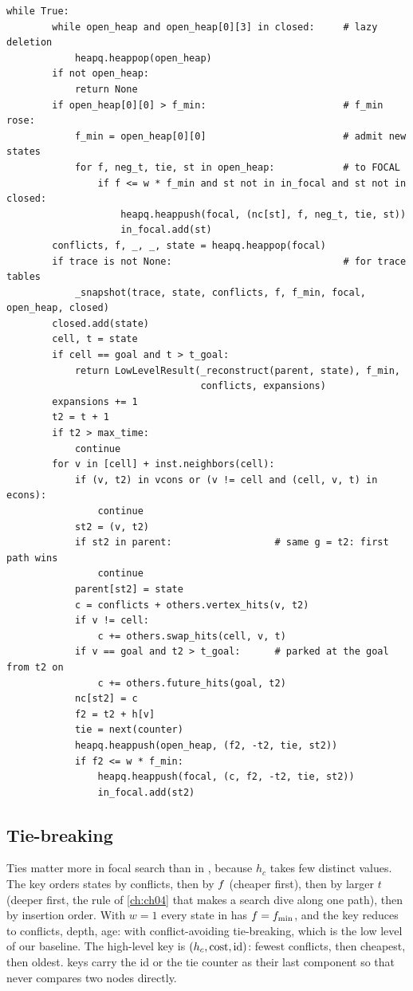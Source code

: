 \begin{lstlisting}[caption={The main loop of the low level: two heaps, lazy purge of \Open, widening of the band, goal test with the lower bound, and successor generation with conflict counts (from \code{code/ch10\_ecbs.py}).},label={lst:ch10-lowlevel}]
    while True:
        while open_heap and open_heap[0][3] in closed:     # lazy deletion
            heapq.heappop(open_heap)
        if not open_heap:
            return None
        if open_heap[0][0] > f_min:                        # f_min rose:
            f_min = open_heap[0][0]                        # admit new states
            for f, neg_t, tie, st in open_heap:            # to FOCAL
                if f <= w * f_min and st not in in_focal and st not in closed:
                    heapq.heappush(focal, (nc[st], f, neg_t, tie, st))
                    in_focal.add(st)
        conflicts, f, _, _, state = heapq.heappop(focal)
        if trace is not None:                              # for trace tables
            _snapshot(trace, state, conflicts, f, f_min, focal, open_heap, closed)
        closed.add(state)
        cell, t = state
        if cell == goal and t > t_goal:
            return LowLevelResult(_reconstruct(parent, state), f_min,
                                  conflicts, expansions)
        expansions += 1
        t2 = t + 1
        if t2 > max_time:
            continue
        for v in [cell] + inst.neighbors(cell):
            if (v, t2) in vcons or (v != cell and (cell, v, t) in econs):
                continue
            st2 = (v, t2)
            if st2 in parent:                  # same g = t2: first path wins
                continue
            parent[st2] = state
            c = conflicts + others.vertex_hits(v, t2)
            if v != cell:
                c += others.swap_hits(cell, v, t)
            if v == goal and t2 > t_goal:      # parked at the goal from t2 on
                c += others.future_hits(goal, t2)
            nc[st2] = c
            f2 = t2 + h[v]
            tie = next(counter)
            heapq.heappush(open_heap, (f2, -t2, tie, st2))
            if f2 <= w * f_min:
                heapq.heappush(focal, (c, f2, -t2, tie, st2))
                in_focal.add(st2)
\end{lstlisting}

\subsection{Tie-breaking}

Ties matter more in focal search than in \astar, because $h_c$ takes few
distinct values. The \Focal key orders states by conflicts, then by
$f$ (cheaper first), then by larger $t$ (deeper first, the rule of
\cref{ch:ch04} that makes a search dive along one path), then by insertion
order. With $w = 1$ every state in \Focal has $f = f_{\min}$, and
the key reduces to conflicts, depth, age: \astar with conflict-avoiding
tie-breaking, which is the low level of our \cbs baseline. The high-level
\Focal key is $(h_c, \operatorname{cost}, \text{id})$: fewest conflicts, then cheapest, then
oldest. \Open keys carry the id or the tie counter as their last component so
that \python never compares two nodes directly.

